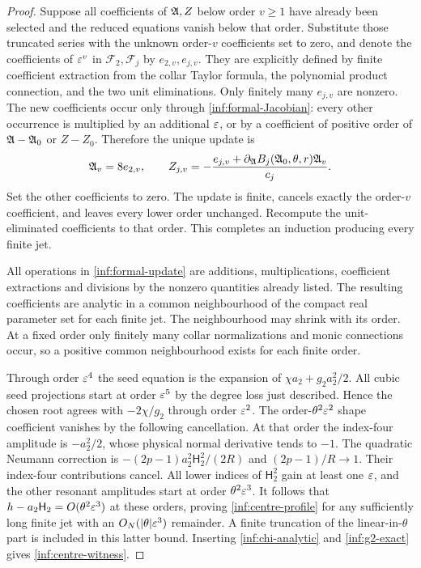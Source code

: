 \begin{proof}
Suppose all coefficients of $\mathfrak A,Z$ below order $v\ge1$ have
already been selected and the reduced equations vanish below
that order. Substitute those truncated series with the unknown
order-$v$ coefficients set to zero, and denote the coefficients
of $\varepsilon^v$ in $\mathcal F_2,\mathcal F_j$ by
$e_{2,v},e_{j,v}$. They are explicitly defined by finite
coefficient extraction from the collar Taylor formula, the
polynomial product connection, and the two unit eliminations.
Only finitely many $e_{j,v}$ are nonzero.
The new coefficients occur only through
\eqref{inf:formal-Jacobian}: every other occurrence is multiplied
by an additional $\varepsilon$, or by a coefficient of positive order
of $\mathfrak A-\mathfrak A_0$ or $Z-Z_0$. Therefore the unique update is
\begin{equation}\label{inf:formal-update}
 \mathfrak A_v=8e_{2,v},\qquad
 Z_{j,v}=-\frac{e_{j,v}
       +\partial_{\mathfrak A}B_j(\mathfrak A_0,\theta,r)\mathfrak A_v}{c_j}.
\end{equation}
Set the other coefficients to zero. The update is finite, cancels
exactly the order-$v$ coefficient, and leaves every lower order
unchanged. Recompute the unit-eliminated coefficients to that
order. This completes an induction producing every finite jet.

All operations in \eqref{inf:formal-update} are additions,
multiplications, coefficient extractions and divisions by the
nonzero quantities already listed. The resulting coefficients
are analytic in a common neighbourhood of the compact real
parameter set for each finite jet. The neighbourhood may shrink
with its order. At a fixed order only finitely many collar
normalizations and monic connections occur, so a positive common
neighbourhood exists for each finite order.

Through order $\varepsilon^4$ the seed equation is the expansion of
$\chi a_2+g_2a_2^2/2$. All cubic seed projections start at order
$\varepsilon^5$ by the degree loss just described. Hence the chosen root
agrees with $-2\chi/g_2$ through order $\varepsilon^2$.
The order-$\theta^2\varepsilon^2$ shape coefficient vanishes by the
following cancellation.
At that order the index-four amplitude is $-a_2^2/2$, whose
physical normal derivative tends to $-1$.
The quadratic Neumann correction is
$-(2p-1)a_2^2\mathsf H_2^2/(2R)$ and $(2p-1)/R\to1$.
Their index-four contributions cancel.
All lower indices of $\mathsf H_2^2$ gain at least one $\varepsilon$, and the other
resonant amplitudes start at order $\theta^2\varepsilon^3$.
It follows that $h-a_2\mathsf H_2=O(\theta^2\varepsilon^3)$ at these orders,
proving \eqref{inf:centre-profile} for any sufficiently long finite
jet with an $O_N(|\theta|\varepsilon^3)$ remainder.
A finite truncation of the linear-in-$\theta$ part is included in
this latter bound. Inserting \eqref{inf:chi-analytic} and
\eqref{inf:g2-exact} gives \eqref{inf:centre-witness}.


\end{proof}
